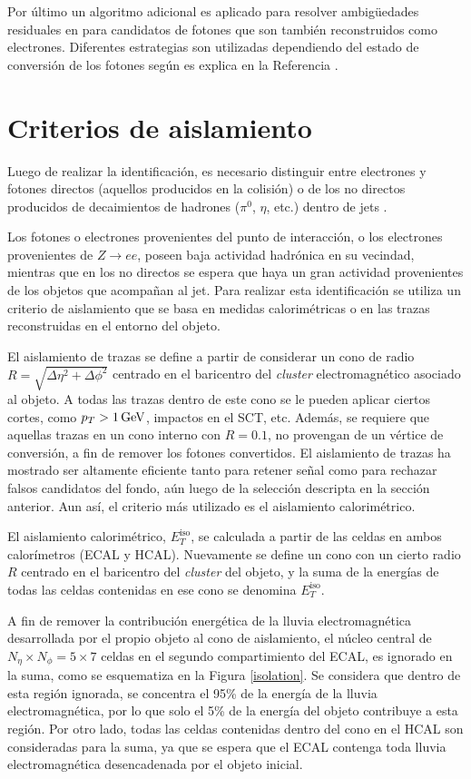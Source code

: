 Por último un algoritmo adicional es aplicado para resolver ambigüedades residuales en para candidatos de fotones que son también reconstruidos como electrones. Diferentes estrategias son utilizadas dependiendo del estado de conversión de los fotones según es explica en la Referencia \cite{ambiguity}.


\section{Criterios de aislamiento}

Luego de realizar la identificación, es necesario distinguir entre electrones y fotones directos (aquellos producidos en la colisión) o de los no directos producidos de decaimientos de hadrones ($\pi^{0}$, $\eta$, etc.) dentro de jets .

Los fotones o electrones provenientes del punto de interacción, o los electrones provenientes de $Z\rightarrow ee$, poseen baja actividad hadrónica en su vecindad, mientras que en los no directos se espera que haya un gran actividad provenientes de los objetos que acompañan al jet. Para realizar esta identificación se utiliza un criterio de aislamiento que se basa en medidas calorimétricas o en las trazas reconstruidas en el entorno del objeto.

El aislamiento de trazas se define a partir de considerar un cono de radio $R=\sqrt{\Delta\eta^{2}+\Delta\phi^{2}}$ centrado en el baricentro del \textit{cluster} electromagnético asociado al objeto. A todas las trazas dentro de este cono se le pueden aplicar ciertos cortes, como $p_{T}>1 \, \mathrm{GeV}$, impactos en el SCT, etc. Además, se requiere que aquellas trazas en un cono interno con $R=0.1$, no provengan de un vértice de conversión, a fin de remover los fotones convertidos. El aislamiento de trazas ha mostrado ser altamente eficiente tanto para retener señal como para rechazar falsos candidatos del fondo, aún luego de la selección descripta en la sección anterior. Aun así, el criterio más utilizado es el aislamiento calorimétrico.

El aislamiento calorimétrico, $E_{T}^{\text{iso}}$, se calculada a partir de las celdas en ambos calorímetros (ECAL y HCAL). Nuevamente se define un cono con un cierto radio $R$ centrado en el baricentro del \textit{cluster} del objeto, y la suma de la energías de todas las celdas contenidas en ese cono se denomina $E_{T}^{\text{iso}}$. 

A fin de remover la contribución energética de la lluvia electromagnética desarrollada por el propio objeto al cono de aislamiento, el núcleo central de $N_{\eta}\times N_{\phi} = 5 \times 7$ celdas en el segundo compartimiento del ECAL, es ignorado en la suma, como se esquematiza en la Figura \ref{isolation}. Se considera que dentro de esta región ignorada, se concentra el 95\% de la energía de la lluvia electromagnética, por lo que solo el 5\% de la energía del objeto contribuye a esta región. Por otro lado, todas las celdas contenidas dentro del cono en el HCAL son consideradas para la suma, ya que se espera que el ECAL contenga toda lluvia electromagnética desencadenada por el objeto inicial. 

